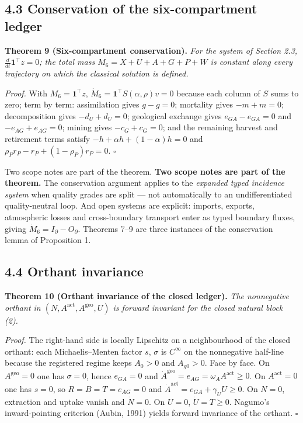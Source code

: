 \documentclass[11pt]{article}
\begin{document}
\subsection*{4.3 Conservation of the six-compartment ledger}\label{43-conservation-of-the-six-compartment-ledger}

\textbf{Theorem 9 (Six-compartment conservation).} \emph{For the system of Section 2.3, \(\frac{d}{dt}\mathbf{1}^\top z =\allowbreak{} 0\); the total mass \(M_6 = X + U + A + G + P + W\) is constant along every trajectory on which the classical solution is defined.}

\emph{Proof.} With \(M_6 = \mathbf{1}^\top z\), \(\dot M_6 =\allowbreak{} \mathbf{1}^\top S(\alpha,\allowbreak{}\rho) v =\allowbreak{} 0\) because each column of \(S\) sums to zero; term by term: assimilation gives \(g - g = 0\); mortality gives \(-m + m = 0\); decomposition gives \(-d_U + d_U = 0\); geological exchange gives \(e_{GA} - e_{GA} = 0\) and \(-e_{AG} + e_{AG} = 0\); mining gives \(-c_G + c_G = 0\); and the remaining harvest and retirement terms satisfy \(-h +\allowbreak{} \alpha h +\allowbreak{} (1-\alpha)h =\allowbreak{} 0\) and \(\rho_P r_P - r_P +\allowbreak{} (1-\rho_P)r_P =\allowbreak{} 0\). \(\square\)

Two scope notes are part of the theorem. \textbf{Two scope notes are part of the theorem.} The conservation argument applies to the \emph{expanded typed incidence system} when quality grades are split --- not automatically to an undifferentiated quality-neutral loop. And open systems are explicit: imports, exports, atmospheric losses and cross-boundary transport enter as typed boundary fluxes, giving \(\dot M_6=\allowbreak{}I_\partial-O_\partial\). Theorems 7--9 are three instances of the conservation lemma of Proposition 1.

\subsection*{4.4 Orthant invariance}\label{44-orthant-invariance}

\textbf{Theorem 10 (Orthant invariance of the closed ledger).} \emph{The nonnegative orthant in \((N,\allowbreak{} A^{\mathrm{act}},\allowbreak{} A^{\mathrm{geo}},\allowbreak{} U)\) is forward invariant for the closed natural block (2).}

\emph{Proof.} The right-hand side is locally Lipschitz on a neighbourhood of the closed orthant: each Michaelis--Menten factor \(s\), \(\sigma\) is \(C^\infty\) on the nonnegative half-line because the registered regime keeps \(A_0 > 0\) and \(A_{g0} > 0\). Face by face. On \(A^{\mathrm{geo}} = 0\) one has \(\sigma = 0\), hence \(e_{GA} = 0\) and \(\dot A^{\mathrm{geo}} =\allowbreak{} e_{AG} =\allowbreak{} \omega_A A^{\mathrm{act}} \ge 0\). On \(A^{\mathrm{act}} = 0\) one has \(s = 0\), so \(R = B = T = e_{AG} = 0\) and \(\dot A^{\mathrm{act}} =\allowbreak{} e_{GA} +\allowbreak{} \gamma_U U \ge 0\). On \(N = 0\), extraction and uptake vanish and \(\dot N = 0\). On \(U = 0\), \(\dot U = T \ge 0\). Nagumo's inward-pointing criterion (Aubin, 1991) yields forward invariance of the orthant. \(\square\)
\end{document}
